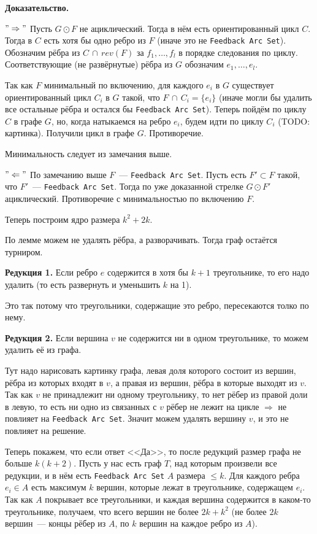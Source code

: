 \documentclass[12pt]{article}
\renewcommand{\le}{\leqslant}
\theoremstyle{definition} %
\theoremstyle{plain} %
\theoremstyle{remark} %
\begin{document}
{\bf Доказательство.}

$"\Rightarrow"$ Пусть $G\odot F$ не ациклический. Тогда в нём есть ориентированный цикл $C$. Тогда в $C$ есть хотя бы одно ребро из $F$ (иначе это не {\tt Feedback Arc Set}). Обозначим рёбра из $C\,\cap\,rev(F)$ за $f_1, \dots ,f_l$ в порядке следования по циклу. Соответствующие (не развёрнутые) рёбра из $G$ обозначим $e_1,\dots,e_l$.

Так как $F$ минимальный по включению, для каждого $e_i$ в $G$ существует ориентированный цикл $C_i$ в $G$ такой, что $F\,\cap\,C_i=\{e_i\}$ (иначе могли бы удалить все остальные рёбра и остался бы {\tt Feedback Arc Set}). Теперь пойдём по циклу $C$ в графе $G$, но, когда натыкаемся на ребро $e_i$, будем идти по циклу $C_i$ (TODO: картинка). Получили цикл в графе $G$. Противоречие.

Минимальность следует из замечания выше.

$"\Leftarrow"$ По замечанию выше $F$~--- {\tt Feedback Arc Set}. Пусть есть $F'\subset F$ такой, что $F'$~--- {\tt Feedback Arc Set}. Тогда по уже доказанной стрелке $G\odot F'$ ациклический. Противоречие с минимальностью по включению $F$.

Теперь построим ядро размера $k^2+2k$. 

По лемме можем не удалять рёбра, а разворачивать. Тогда граф остаётся турниром. 

{\bf Редукция 1.} Если ребро $e$ содержится в хотя бы $k+1$ треугольнике, то его надо удалить (то есть развернуть и уменьшить $k$ на 1).

Это так потому что треугольники, содержащие это ребро, пересекаются толко по нему.

{\bf Редукция 2.} Если вершина $v$ не содержится ни в одном треугольнике, то можем удалить её из графа.

Тут надо нарисовать картинку графа, левая доля которого состоит из вершин, рёбра из которых входят в $v$, а правая из вершин, рёбра в которые выходят из $v$. Так как $v$ не принадлежит ни одному треугольнику, то нет рёбер из правой доли в левую, то есть ни одно из связанных с $v$ рёбер не лежит на цикле $\Rightarrow$ не повлияет на {\tt Feedback Arc Set}. Значит можем удалять вершину $v$, и это не повлияет на решение.

Теперь покажем, что если ответ <<Да>>, то после редукций размер графа не больше $k(k+2)$. Пусть у нас есть граф $T$, над которым произвели все редукции, и в нём есть {\tt Feedback Arc Set} $A$ размера $\le k$. Для каждого ребра $e_i\in A$ есть максимум $k$ вершин, которые лежат в треугольнике, содержащем $e_i$. Так как $A$ покрывает все треугольники, и каждая вершина содержится в каком-то треугольнике, получаем, что всего вершин не более $2k+k^2$ (не более $2k$ вершин~--- концы рёбер из $A$, по $k$ вершин на каждое ребро из $A$).
\end{document}

